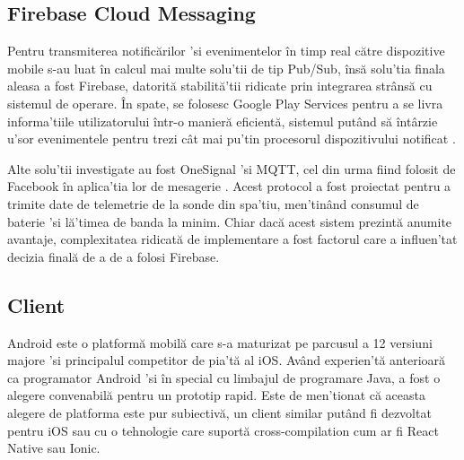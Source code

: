 \subsection {Firebase Cloud Messaging}

Pentru transmiterea notificărilor 'si evenimentelor în timp real către dispozitive mobile s-au luat în calcul mai multe solu'tii de tip Pub/Sub, însă solu'tia finala aleasa a fost Firebase, datorită stabilită'tii ridicate prin integrarea strânsă cu sistemul de operare. În spate, se folosesc Google Play Services pentru a se livra informa'tiile utilizatorului într-o manieră eficientă, sistemul putând să  întârzie u'sor evenimentele pentru trezi cât mai pu'tin procesorul dispozitivului notificat \cite{FirebaseGoogle2022}.

Alte solu'tii investigate au fost OneSignal 'si MQTT, cel din urma fiind folosit de Facebook în aplica'tia lor de mesagerie \cite{LucyZhang2021}. Acest protocol a fost proiectat pentru a trimite date de telemetrie de la sonde din spa'tiu, men'tinând consumul de baterie 'si lă'timea de banda la minim. Chiar dacă acest sistem prezintă anumite avantaje, complexitatea ridicată de implementare a fost factorul care a influen'tat decizia finală de a de a folosi Firebase. 

\subsection {Client}

Android este o platformă mobilă care s-a maturizat pe parcusul a 12 versiuni majore 'si principalul competitor de pia'tă al iOS. Având experien'tă anterioară ca programator Android 'si în special cu limbajul de programare Java, a fost o alegere convenabilă pentru un prototip rapid.
Este de men'tionat că aceasta alegere de platforma este pur subiectivă, un client similar putând fi dezvoltat pentru iOS sau cu o tehnologie care suportă cross-compilation cum ar fi React Native sau Ionic.
